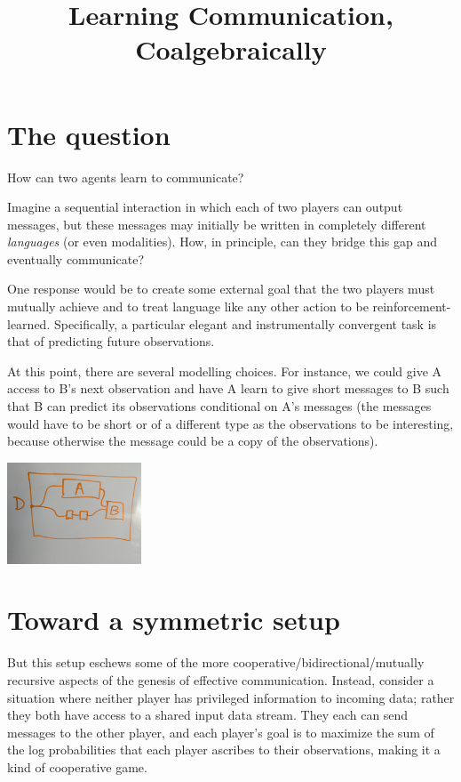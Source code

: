 \documentclass{article}
\title{Learning Communication, Coalgebraically}
\author{}
\date{}
\begin{document}
\maketitle

\section{The question}

How can two agents learn to communicate?

Imagine a sequential interaction in which each of two players can output messages, but these messages may initially be written in completely different \emph{languages} (or even modalities).
How, in principle, can they bridge this gap and eventually communicate?

One response would be to create some external goal that the two players must mutually achieve and to treat language like any other action to be reinforcement-learned. Specifically, a particular elegant and instrumentally convergent task is that of predicting future observations. 

At this point, there are several modelling choices.
For instance, we could give A access to B's next observation and have A learn to give short messages to B such that B can predict its observations conditional on A's messages (the messages would have to be short or of a different type as the observations to be interesting, because otherwise the message could be a copy of the observations).

\bigskip
\begin{center}
\includegraphics[width=0.3\textwidth]{Apriority.jpg}
\end{center}

\section{Toward a symmetric setup}

But this setup eschews some of the more cooperative/bidirectional/mutually recursive aspects of the genesis of effective communication.
Instead, consider a situation where neither player has privileged information to incoming data; rather they both have access to a shared input data stream. They each can send messages to the other player, and each player's goal is to maximize the sum of the log probabilities that each player ascribes to their observations, making it a kind of cooperative game.
\end{document}
